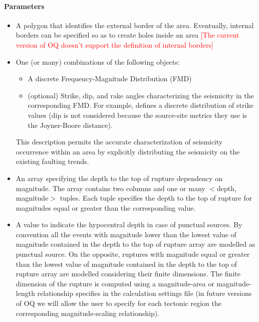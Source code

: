 \paragraph{Parameters}
\begin{itemize}
\item A polygon that identifies the external border of the area. Eventually, 
internal borders can be specified so as to create holes inside an area
	\textcolor{red}{[The current version of OQ doesn't support the definition of internal borders]}
\item One (or many) combinations of the following objects:
\begin{itemize}
	\item A discrete Frequency-Magnitude Distribution (FMD)
	\item (optional) Strike, dip, and rake angles characterizing the seismicity  in the corresponding FMD.
	For example, \cite{coppersmith2009} defines a discrete distribution of strike values (dip is not considered because the source-site metrics they use is the Joyner-Boore distance). 
\end{itemize}
This description permits the accurate characterization of seismicity occurrence within an area by explicitly distributing the seismicity on the existing faulting trends. 
\item An array specifying the depth to the top of rupture dependency on magnitude. The array contains two columns and one or many $<$depth, magnitude$>$ tuples. Each tuple specifies the depth to the top of rupture for magnitudes equal or greater than the corresponding value. 
\item A value to indicate the hypocentral depth in case of punctual sources. 
By convention all the events with magnitude lower than the lowest value of magnitude contained in the depth to the top of rupture array are modelled as punctual source. On the opposite, ruptures with magnitude equal or greater than the lowest value of magnitude contained in the depth to the top of rupture array are modelled considering their finite dimensions. The finite dimension of the rupture is computed using a magnitude-area or magnitude-length relationship specifies in the calculation settings file (in future versions of OQ we will allow the user to specify for each tectonic region the corresponding magnitude-scaling relationship).
\end{itemize}
%
